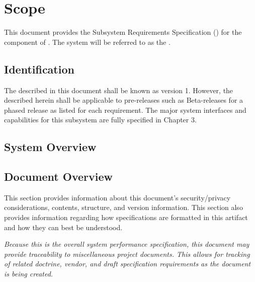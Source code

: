 
\chapter{Scope}
\label{loc:Scope}


This document provides the Subsystem Requirements Specification (\SRS) for the \ThisSubSys component of \ThisSystem. 
The system will be referred to as the \ThisSys.


\section{Identification}
\label{loc:Identification}


The \ThisSystem described in this document shall be known as \ThisSys version 1.
However, the \SRS described herein shall be applicable to pre-releases such as Beta-releases for a phased release as listed for each requirement.
The major system interfaces and capabilities for this subsystem are fully specified in Chapter 3.


\section{System Overview}
\label{loc:SystemOverview}





\newpage
\section{Document Overview}
\label{loc:DocumentOverview}


This section provides information about this document's security/privacy considerations, contents, structure, and version information.
This section also provides information regarding how specifications are formatted in this artifact and how they can best be understood.

% 

% 

% 

% 

% 

% 

{\em 
Because this is the overall system performance specification, this document may provide traceability to miscellaneous project documents.
This allows for tracking of related doctrine, vendor, and draft specification requirements as the document is being created.
}



